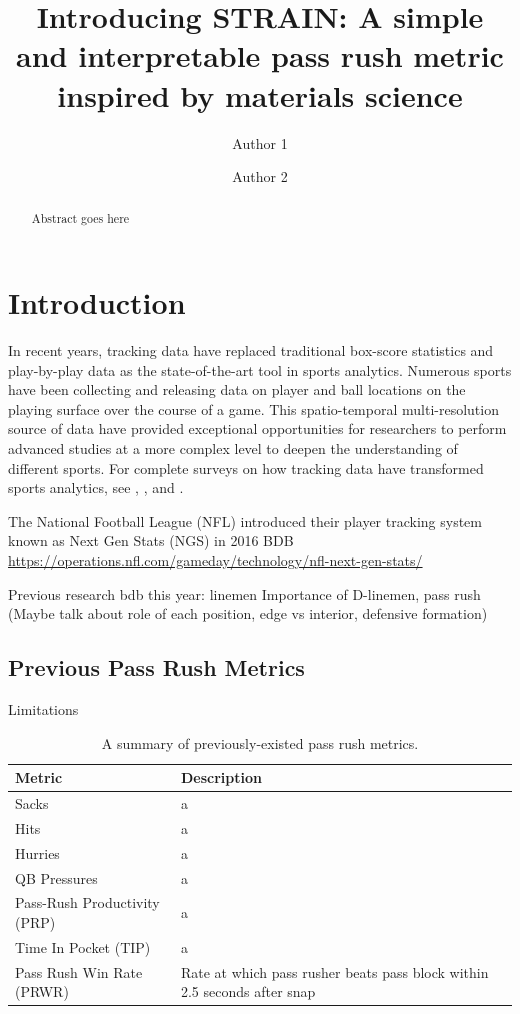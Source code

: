 \documentclass{statsoc}
\title[STRAIN]{Introducing STRAIN: A simple and interpretable pass rush
metric inspired by materials science}
\author[]{Author 1}
\author[]{Author 2}
\begin{document}
\begin{abstract}
Abstract goes here
\end{abstract}

\newpage

\hypertarget{introduction}{%
\section{Introduction}\label{introduction}}

In recent years, tracking data have replaced traditional box-score
statistics and play-by-play data as the state-of-the-art tool in sports
analytics. Numerous sports have been collecting and releasing data on
player and ball locations on the playing surface over the course of a
game. This spatio-temporal multi-resolution source of data have provided
exceptional opportunities for researchers to perform advanced studies at
a more complex level to deepen the understanding of different sports.
For complete surveys on how tracking data have transformed sports
analytics, see \citet{Macdonald2020Recreating}, \citet{Baumer2023Big},
and \citet{Kovalchik2023Player}.

The National Football League (NFL) introduced their player tracking
system known as Next Gen Stats (NGS) in 2016 BDB
\url{https://operations.nfl.com/gameday/technology/nfl-next-gen-stats/}

Previous research bdb this year: linemen Importance of D-linemen, pass
rush (Maybe talk about role of each position, edge vs interior,
defensive formation)

\hypertarget{previous-pass-rush-metrics}{%
\subsection{Previous Pass Rush
Metrics}\label{previous-pass-rush-metrics}}

Limitations

\begin{table}
\caption{A summary of previously-existed pass rush metrics. \label{tab:metrics}}
\centering
\begin{tabular}{ll}
\toprule
\textbf{Metric} & \textbf{Description}\\
\midrule
Sacks & a\\
Hits & a\\
Hurries & a\\
QB Pressures & a\\
Pass-Rush Productivity (PRP) & a\\
Time In Pocket (TIP) & a\\
Pass Rush Win Rate (PRWR) & Rate at which pass rusher beats pass block within 2.5 seconds after snap\\
\bottomrule
\end{tabular}
\end{table}
\end{document}

